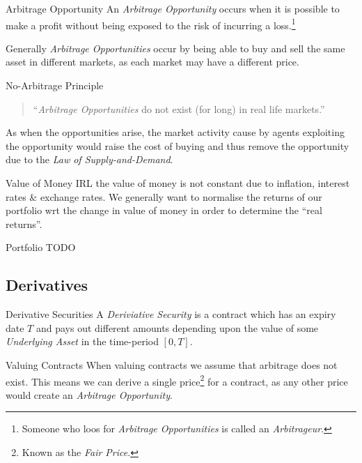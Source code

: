 \documentclass[11pt,a4paper]{article}
\begin{document}
  \begin{definition}{Arbitrage Opportunity}
    An \textit{Arbitrage Opportunity} occurs when it is possible to make a profit without being exposed to the risk of incurring a loss.\footnote{Someone who loos for \textit{Arbitrage Opportunities} is called an \textit{Arbitrageur}.}
    \par Generally \textit{Arbitrage Opportunities} occur by being able to buy and sell the same asset in different markets, as each market may have a different price.
  \end{definition}

  \begin{theorem}{No-Arbitrage Principle}
    \begin{quote}
      ``\textit{Arbitrage Opportunities} do not exist (for long) in real life markets.''
    \end{quote}
    As when the opportunities arise, the market activity cause by agents exploiting the opportunity would raise the cost of buying and thus remove the opportunity due to the \textit{Law of Supply-and-Demand}.
  \end{theorem}

  \begin{remark}{Value of Money}
    IRL the value of money is not constant due to inflation, interest rates \& exchange rates. We generally want to normalise the returns of our portfolio wrt the change in value of money in order to determine the ``real returns''.
  \end{remark}

  \begin{definition}{Portfolio}
    TODO
  \end{definition}

\subsection{Derivatives}

  \begin{definition}{Derivative Securities}
    A \textit{Deriviative Security} is a contract which has an expiry date $T$ and pays out different amounts depending upon the value of some \textit{Underlying Asset} in the time-period $[0,T]$.
  \end{definition}

  \begin{remark}{Valuing Contracts}
    When valuing contracts we assume that arbitrage does not exist. This means we can derive a single price\footnote{Known as the \textit{Fair Price}.} for a contract, as any other price would create an \textit{Arbitrage Opportunity}.
  \end{remark}
\end{document}
